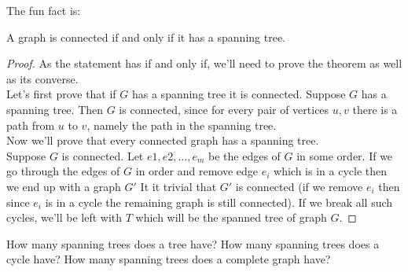 The fun fact is:\\
\begin{theorem}
    A graph is connected if and only if it has a spanning tree.
\end{theorem}
\begin{proof}
As the statement has if and only if, we'll need to prove the theorem as well as its converse. \\
Let's first prove that if $G$ has a spanning tree it is connected. Suppose $G$ has a spanning tree. Then $G$ is connected, since for every pair of vertices $u, v$ there is a path from $u$ to $v$, namely the path in the spanning tree.\\
Now we'll prove that every connected graph has a spanning tree.\\ Suppose $G$ is connected. Let $e1, e2, \dots, e_m$ be the edges of $G$ in some order. If we go through the edges of $G$ in order and remove edge $e_i$ which is in a cycle then we end up with a graph $G'$
It it trivial that $G'$ is connected (if we remove $e_i$ then since $e_i$ is in a cycle the remaining graph is still connected). If we break all such cycles, we'll be left with $T$ which will be the spanned tree of graph $G$. 
\end{proof}
\begin{example}
    How many spanning trees does a tree have? How many spanning trees does a cycle have? How many spanning trees does a complete graph have?
\end{example}
